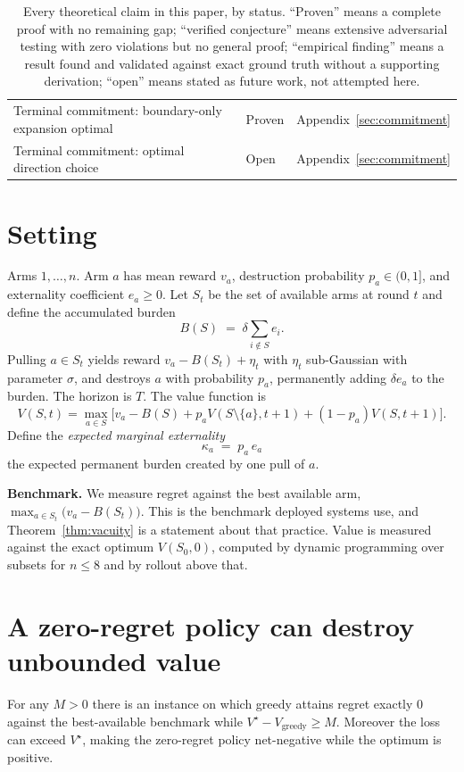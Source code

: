 \begin{table}[h]
\begin{tabular}{lll}
Terminal commitment: boundary-only expansion optimal & Proven & Appendix~\ref{sec:commitment} \\
Terminal commitment: optimal direction choice & Open & Appendix~\ref{sec:commitment} \\
\bottomrule
\end{tabular}
\caption{Every theoretical claim in this paper, by status. ``Proven'' means a
complete proof with no remaining gap; ``verified conjecture'' means extensive
adversarial testing with zero violations but no general proof; ``empirical
finding'' means a result found and validated against exact ground truth
without a supporting derivation; ``open'' means stated as future work, not
attempted here.}
\label{tab:status}
\end{table}

\section{Setting}
\label{sec:model}

Arms $1,\dots,n$. Arm $a$ has mean reward $v_a$, destruction probability
$p_a \in (0,1]$, and externality coefficient $e_a \ge 0$. Let $S_t$ be the set of
available arms at round $t$ and define the accumulated burden
\[
B(S) \;=\; \delta \sum_{i \notin S} e_i .
\]
Pulling $a \in S_t$ yields reward $v_a - B(S_t) + \eta_t$ with $\eta_t$
sub-Gaussian with parameter $\sigma$, and destroys $a$ with probability $p_a$,
permanently adding $\delta e_a$ to the burden. The horizon is $T$. The value
function is
\[
V(S,t) = \max_{a \in S}\Big[ v_a - B(S) + p_a V(S\setminus\{a\}, t{+}1)
  + (1-p_a) V(S, t{+}1) \Big].
\]
Define the \emph{expected marginal externality}
\[
\boxed{\;\kappa_a \;=\; p_a\, e_a\;}
\]
the expected permanent burden created by one pull of $a$.

\textbf{Benchmark.} We measure regret against the best available arm,
$\max_{a \in S_t}\big(v_a - B(S_t)\big)$. This is the benchmark deployed systems
use, and Theorem~\ref{thm:vacuity} is a statement about that practice. Value is
measured against the exact optimum $V(S_0,0)$, computed by dynamic programming over
subsets for $n \le 8$ and by rollout above that.

\section{A zero-regret policy can destroy unbounded value}

\begin{theorem}
\label{thm:vacuity}
For any $M > 0$ there is an instance on which greedy attains regret exactly $0$
against the best-available benchmark while $V^\star - V_{\mathrm{greedy}} \ge M$.
Moreover the loss can exceed $V^\star$, making the zero-regret policy net-negative
while the optimum is positive.
\end{theorem}

